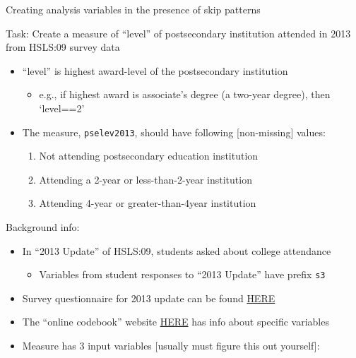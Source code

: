 \documentclass[8pt,ignorenonframetext,dvipsnames]{beamer}
\providecommand{\tightlist}{%
  \setlength{\itemsep}{0pt}\setlength{\parskip}{0pt}}
\begin{document}
\begin{frame}[fragile]{Creating analysis variables in the presence of
skip patterns}

Task: Create a measure of ``level'' of postsecondary institution
attended in 2013 from HSLS:09 survey data

\begin{itemize}
\tightlist
\item
  ``level'' is highest award-level of the postsecondary institution

  \begin{itemize}
  \tightlist
  \item
    e.g., if highest award is associate's degree (a two-year degree),
    then `level==2'
  \end{itemize}
\item
  The measure, \texttt{pselev2013}, should have following
  {[}non-missing{]} values:

  \begin{enumerate}
  \def\labelenumi{\arabic{enumi}.}
  \tightlist
  \item
    Not attending postsecondary education institution
  \item
    Attending a 2-year or less-than-2-year institution
  \item
    Attending 4-year or greater-than-4year institution
  \end{enumerate}
\end{itemize}

Background info:

\begin{itemize}
\tightlist
\item
  In ``2013 Update'' of HSLS:09, students asked about college attendance

  \begin{itemize}
  \tightlist
  \item
    Variables from student responses to ``2013 Update'' have prefix
    \texttt{s3}
  \end{itemize}
\item
  Survey questionnaire for 2013 update can be found
  \href{https://nces.ed.gov/surveys/hsls09/pdf/2013_Student_Parent_Questionnaire.pdf}{HERE}
\item
  The ``online codebook'' website
  \href{https://nces.ed.gov/onlinecodebook}{HERE} has info about
  specific variables
\item
  Measure has 3 input variables {[}usually must figure this out
  yourself{]}:


\end{itemize}
\end{frame}
\end{document}
